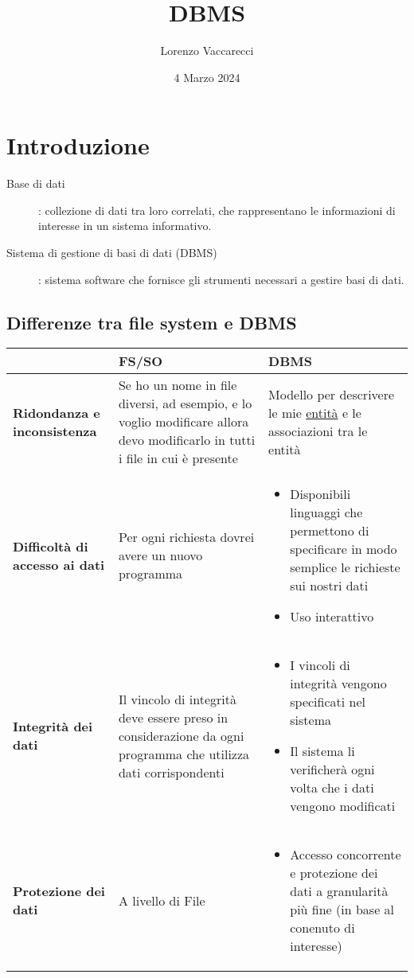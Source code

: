 \documentclass[12pt]{article}
\title{DBMS}
\author{Lorenzo Vaccarecci}
\date{4 Marzo 2024}
\begin{document}
\maketitle
\section{Introduzione}
\begin{description}
    \item[Base di dati]: collezione di dati tra loro correlati, che rappresentano le informazioni di interesse in un sistema informativo.
    \item[Sistema di gestione di basi di dati (DBMS)]: sistema software che fornisce gli strumenti necessari a gestire basi di dati. 
\end{description}
\subsection{Differenze tra file system e DBMS}
\begin{center}
    \begin{tabular}{| m{6em} | m{20em} | m{15em} |}
        \hline
         & \textbf{FS/SO} & \textbf{DBMS} \\
        \hline
        \textbf{Ridondanza e inconsistenza} & 
        Se ho un nome in file diversi, ad esempio, e lo voglio modificare allora devo modificarlo in tutti i file in cui è presente & 
        Modello per descrivere le mie \uline{entità} e le associazioni tra le entità \\
        \hline
        \textbf{Difficoltà di accesso ai dati} &
        Per ogni richiesta dovrei avere un nuovo programma &
        \begin{itemize}
            \setlength\itemsep{0em}
            \item Disponibili linguaggi che permettono di specificare in modo semplice le richieste sui nostri dati
            \item Uso interattivo
        \end{itemize}
        \\
        \hline
        \textbf{Integrità dei dati} &
        Il vincolo di integrità deve essere preso in considerazione da ogni programma che utilizza dati corrispondenti&
        \begin{itemize}
            \setlength\itemsep{0em}
            \item I vincoli di integrità vengono specificati nel sistema
            \item Il sistema li verificherà ogni volta che i dati vengono modificati
        \end{itemize} \\
        \hline
        \textbf{Protezione dei dati} &
        A livello di File&
        \begin{itemize}
            \setlength\itemsep{0em}
            \item Accesso concorrente e protezione dei dati a granularità più fine (in base al conenuto di interesse)
        \end{itemize} \\
        \hline
    \end{tabular}
\end{center}
\end{document}
